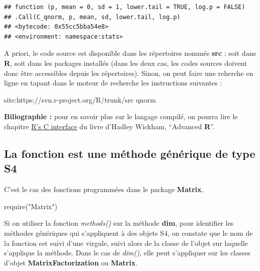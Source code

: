 \documentclass[
]{book}
\newenvironment{Shaded}{\begin{snugshade}}{\end{snugshade}}
\newcommand{\ExtensionTok}[1]{#1}
\newcommand{\FunctionTok}[1]{\textcolor[rgb]{0.00,0.00,0.00}{#1}}
\newcommand{\NormalTok}[1]{#1}
\newcommand{\StringTok}[1]{\textcolor[rgb]{0.31,0.60,0.02}{#1}}
\theoremstyle{definition}
\theoremstyle{definition}
\theoremstyle{definition}
\theoremstyle{definition}
\theoremstyle{remark}
\begin{document}
\begin{verbatim}
## function (p, mean = 0, sd = 1, lower.tail = TRUE, log.p = FALSE) 
## .Call(C_qnorm, p, mean, sd, lower.tail, log.p)
## <bytecode: 0x55cc5bba54e8>
## <environment: namespace:stats>
\end{verbatim}

A priori, le code source est disponible dans les répertoires nommés \textbf{src} : soit dans \textbf{R}, soit dans les packages installés (dans les deux cas, les codes sources doivent donc être accessibles depuis les répertoires). Sinon, on peut faire une reherche en ligne en tapant dans le moteur de recherche les instructions suivantes :

\begin{Shaded}
\begin{Highlighting}[]
\ExtensionTok{site:https://svn.r{-}project.org/R/trunk/src}\NormalTok{ qnorm}
\end{Highlighting}
\end{Shaded}

\textbf{Biliographie : } pour en savoir plus sur le langage compilé, on pourra lire le chapitre \href{http://adv-r.had.co.nz/C-interface.html\#c-find-source}{R's C interface} du livre d'Hadley Wickham, ``Advanced \textbf{R}''.

\hypertarget{la-fonction-est-une-muxe9thode-guxe9nuxe9rique-de-type-s4}{%
\subsection{La fonction est une méthode générique de type S4}\label{la-fonction-est-une-muxe9thode-guxe9nuxe9rique-de-type-s4}}

C'est le cas des fonctions programmées dans le package \textbf{Matrix}.

\begin{Shaded}
\begin{Highlighting}[]
\FunctionTok{require}\NormalTok{(}\StringTok{"Matrix"}\NormalTok{)}
\end{Highlighting}
\end{Shaded}

Si on utiliser la fonction \emph{methods()} sur la méthode \textbf{dim}, pour identifier les méthodes génériques qui s'appliquent à des objets S4, on constate que le nom de la fonction est suivi d'une virgule, suivi alors de la classe de l'objet sur laquelle s'applique la méthode. Dans le cas de \emph{dim()}, elle peut s'appliquer sur les classes d'objet \textbf{MatrixFactorization} ou \textbf{Matrix}.
\end{document}
